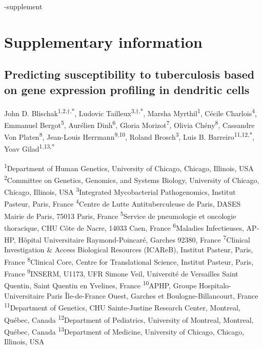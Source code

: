 \documentclass[fleqn,10pt]{wlscirep}
\newcommand{\beginsupplement}{%
 \setcounter{table}{0}
 \renewcommand{\thetable}{S\arabic{table}}%
 \setcounter{figure}{0}
 \renewcommand{\thefigure}{S\arabic{figure}}%
 }
\begin{document}
\begin{filecontents}{\jobname-supplement}
\beginsupplement
\section*{Supplementary information}

\subsection*{Predicting susceptibility to tuberculosis based on gene expression profiling in dendritic cells}


John D. Blischak\textsuperscript{1,2,$\dag$,*}, Ludovic
Tailleux\textsuperscript{3,$\dag$,*}, Marsha
Myrthil\textsuperscript{1}, Cécile Charlois\textsuperscript{4},
Emmanuel Bergot\textsuperscript{5}, Aurélien Dinh\textsuperscript{6},
Gloria Morizot\textsuperscript{7}, Olivia Chény\textsuperscript{8},
Cassandre Von Platen\textsuperscript{8}, Jean-Louis
Herrmann\textsuperscript{9,10}, Roland Brosch\textsuperscript{3}, Luis
B.
Barreiro\textsuperscript{1}\textsuperscript{1}\textsuperscript{,1}\textsuperscript{2}\textsuperscript{,*},
Yoav Gilad\textsuperscript{1,}\textsuperscript{13}\textsuperscript{,*}


\textsuperscript{1}Department of Human Genetics, University of
Chicago, Chicago, Illinois, USA
\textsuperscript{2}Committee on Genetics, Genomics, and Systems
Biology, University of Chicago, Chicago, Illinois, USA
\textsuperscript{3}Integrated Mycobacterial Pathogenomics, Institut
Pasteur, Paris, France
\textsuperscript{4}Centre de Lutte Antituberculeuse de Paris, DASES
Mairie de Paris, 75013 Paris, France
\textsuperscript{5}Service de pneumologie et oncologie thoracique, CHU
Côte de Nacre, 14033 Caen, France
\textsuperscript{6}Maladies Infectieuses, AP-HP, Hôpital Universitaire
Raymond-Poincaré, Garches 92380, France
\textsuperscript{7}Clinical Investigation \& Access Biological
Resources (ICAReB), Institut Pasteur, Paris, France
\textsuperscript{8}Clinical Core, Centre for Translational Science,
Institut Pasteur, Paris, France
\textsuperscript{9}INSERM, U1173, UFR Simone Veil, Université de
Versailles Saint Quentin, Saint Quentin en Yvelines, France
\textsuperscript{10}APHP, Groupe Hospitalo-Universitaire Paris
Île-de-France Ouest, Garches et Boulogne-Billancourt, France
\textsuperscript{11}Department of Genetics, CHU Sainte-Justine
Research Center, Montreal, Québec, Canada
\textsuperscript{12}Department of Pediatrics, University of Montreal,
Montreal, Québec, Canada
\textsuperscript{13}Department of Medicine, University of Chicago,
Chicago, Illinois, USA



\end{filecontents}
\end{document}
